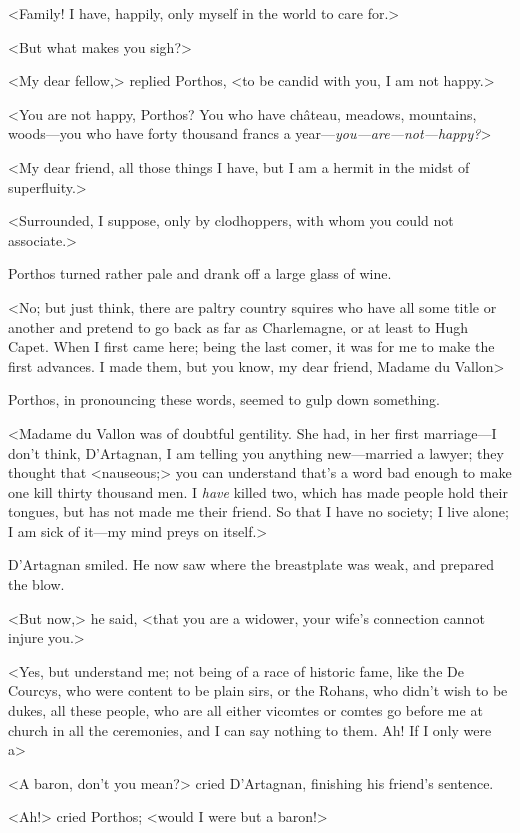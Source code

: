 <Family! I have, happily, only myself in the world to care for.>

<But what makes you sigh?>

<My dear fellow,> replied Porthos, <to be candid with you, I am not happy.>

<You are not happy, Porthos? You who have château, meadows, mountains, woods—you who have forty thousand francs a year—\textit{you—are—not—happy?}>

<My dear friend, all those things I have, but I am a hermit in the midst of superfluity.>

<Surrounded, I suppose, only by clodhoppers, with whom you could not associate.>

Porthos turned rather pale and drank off a large glass of wine.

<No; but just think, there are paltry country squires who have all some title or another and pretend to go back as far as Charlemagne, or at least to Hugh Capet. When I first came here; being the last comer, it was for me to make the first advances. I made them, but you know, my dear friend, Madame du Vallon\longdash>

Porthos, in pronouncing these words, seemed to gulp down something.

<Madame du Vallon was of doubtful gentility. She had, in her first marriage—I don't think, D'Artagnan, I am telling you anything new—married a lawyer; they thought that <nauseous;> you can understand that's a word bad enough to make one kill thirty thousand men. I \textit{have} killed two, which has made people hold their tongues, but has not made me their friend. So that I have no society; I live alone; I am sick of it—my mind preys on itself.>

D'Artagnan smiled. He now saw where the breastplate was weak, and prepared the blow.

<But now,> he said, <that you are a widower, your wife's connection cannot injure you.>

<Yes, but understand me; not being of a race of historic fame, like the De Courcys, who were content to be plain sirs, or the Rohans, who didn't wish to be dukes, all these people, who are all either vicomtes or comtes go before me at church in all the ceremonies, and I can say nothing to them. Ah! If I only were a\longdash>

<A baron, don't you mean?> cried D'Artagnan, finishing his friend's sentence.

<Ah!> cried Porthos; <would I were but a baron!>

